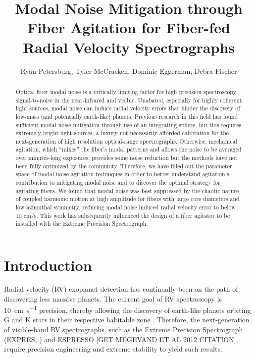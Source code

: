 \documentclass[twocolumn]{emulateapj}
\begin{document}
\title{Modal Noise Mitigation through Fiber Agitation for Fiber-fed Radial Velocity Spectrographs}

\author{Ryan Petersburg, Tyler McCracken, Dominic Eggerman, Debra Fischer}

\begin{abstract}

Optical fiber modal noise is a critically limiting factor for high precision spectroscopy signal-to-noise in the near-infrared and visible. Unabated, especially for highly coherent light sources, modal noise can induce radial velocity errors that hinder the discovery of low-mass (and potentially earth-like) planets. Previous research in this field has found sufficient modal noise mitigation through use of an integrating sphere, but this requires extremely bright light sources, a luxury not necessarily afforded calibration for the next-generation of high resolution optical-range spectrographs. Otherwise, mechanical agitation, which ``mixes'' the fiber's modal patterns and allows the noise to be averaged over minutes-long exposures, provides some noise reduction but the methods have not been fully optimized by the community. Therefore, we have filled out the parameter space of modal noise agitation techniques in order to better understand agitation's contribution to mitigating modal noise and to discover the optimal strategy for agitating fibers. We found that modal noise was best suppressed by the chaotic nature of coupled harmonic motion at high amplitude for fibers with large core diameters and low azimuthal symmetry, reducing modal noise induced radial velocity error to below 10 cm/s. This work has subsequently influenced the design of a fiber agitator to be installed with the Extreme Precision Spectrograph.

\end{abstract}


\section{Introduction}
\label{sec:intro}

Radial velocity (RV) exoplanet detection has continually been on the path of discovering less massive planets. The current goal of RV spectroscopy is \SI{10}{\centi\meter\per\second} precision, thereby allowing the discovery of earth-like planets orbiting G and K stars in their respective habitable zone \citep{Fischer2016}. Therefore, the next-generation of visible-band RV spectrographs, such as the Extreme Precision Spectrograph (EXPRES, \citep{Jurgenson2016}) and ESPRESSO [GET MEGEVAND ET AL 2012 CITATION], require precision engineering and extreme stability to yield such results.
\end{document}
